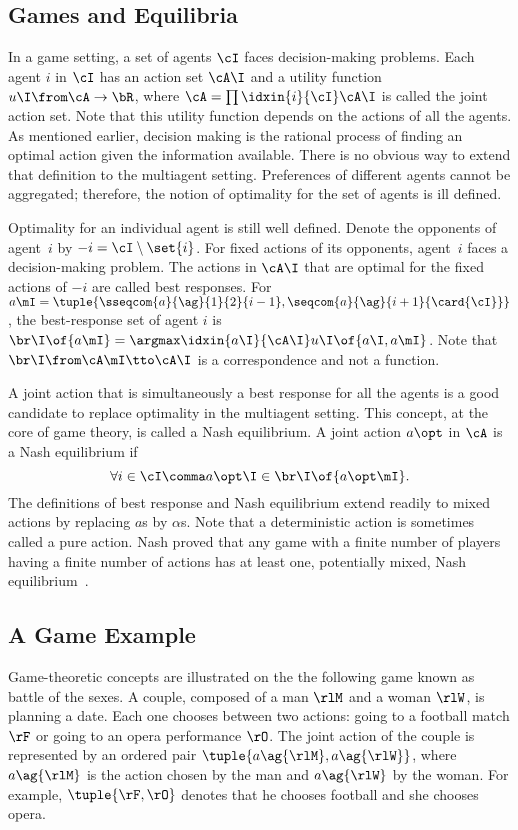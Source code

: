 \subsection{Games and Equilibria}
In a game setting, a set of agents \(\cI\) faces decision-making problems.
Each agent \(i\) in \(\cI\) has an action set \(\cA\I\) and a utility function \(u\I \from \cA \to \bR\), where \(\cA = \prod \idxin{i}{\cI} \cA\I\) is called the joint action set.
Note that this utility function depends on the actions of all the agents.
As mentioned earlier, decision making is the rational process of finding an optimal action given the information available.
There is no obvious way to extend that definition to the multiagent setting.
Preferences of different agents cannot be aggregated; therefore, the notion of optimality for the set of agents is ill defined.

Optimality for an individual agent is still well defined.
Denote the opponents of agent~\(i\) by \(-i = \cI \setminus \set{i}\).
For fixed actions of its opponents, agent~\(i\) faces a decision-making problem.
The actions in \(\cA\I\) that are optimal for the fixed actions of \(-i\) are called best responses.
For \(a\mI = \tuple{\sseqcom{a}{\ag}{1}{2}{i-1},\seqcom{a}{\ag}{i+1}{\card{\cI}}}\), the best-response set of agent \(i\) is~\(\br\I \of {a\mI} = \argmax\idxin{a\I}{\cA\I} u\I \of {a\I, a\mI}\).
Note that \(\br\I \from \cA\mI \tto \cA\I\) is a correspondence and not a function.

A joint action that is simultaneously a best response for all the agents is a good candidate to replace optimality in the multiagent setting.
This concept, at the core of game theory, is called a Nash equilibrium.
A joint action \(a\opt\) in \(\cA\) is a Nash equilibrium if
\begin{equation}
\label{eq:nash_equilibrium}
\forall i \in \cI \comma a\opt\I \in \br\I \of {a\opt\mI}.
\end{equation}
The definitions of best response and Nash equilibrium extend readily to mixed actions by replacing \(a\)s by \(\alpha\)s.
Note that a deterministic action is sometimes called a pure action.
Nash proved that any game with a finite number of players having a finite number of actions has at least one, potentially mixed, Nash equilibrium~\cite{nash:1951}.

\subsection{A Game Example}
Game-theoretic concepts are illustrated on the the following game known as battle of the sexes.
A couple, composed of a man \(\rlM\) and a woman \(\rlW\), is planning a date.
Each one chooses between two actions: going to a football match \(\rF\) or going to an opera performance \(\rO\).
The joint action of the couple is represented by an ordered pair \(\tuple{a\ag{\rlM}, a\ag{\rlW}}\), where \(a\ag{\rlM}\) is the action chosen by the man and \(a\ag{\rlW}\) by the woman.
For example, \(\tuple{\rF, \rO}\) denotes that he chooses football and she chooses opera.

